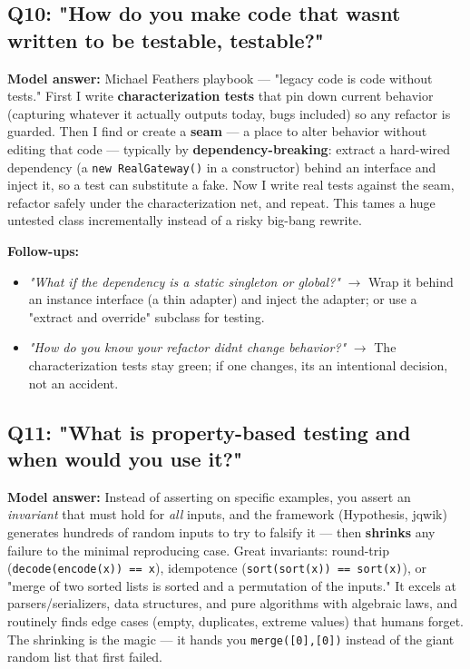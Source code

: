 \documentclass[11pt]{article}
\providecommand{\tightlist}{\setlength{\itemsep}{1pt}\setlength{\parskip}{0pt}}
\begin{document}
\subsection{Q10: "How do you make code that wasn\textquotesingle t written to be testable, testable?"}\label{q10-how-do-you-make-code-that-wasnt-written-to-be-testable-testable}

\textbf{Model answer:} Michael Feathers\textquotesingle{} playbook --- "legacy code is code without tests." First I write \textbf{characterization tests} that pin down current behavior (capturing whatever it actually outputs today, bugs included) so any refactor is guarded. Then I find or create a \textbf{seam} --- a place to alter behavior without editing that code --- typically by \textbf{dependency-breaking}: extract a hard-wired dependency (a \texttt{new\ RealGateway()} in a constructor) behind an interface and inject it, so a test can substitute a fake. Now I write real tests against the seam, refactor safely under the characterization net, and repeat. This tames a huge untested class incrementally instead of a risky big-bang rewrite.

\textbf{Follow-ups:}

\begin{itemize}
\tightlist
\item
  \emph{"What if the dependency is a static singleton or global?"} \(\rightarrow\) Wrap it behind an instance interface (a thin adapter) and inject the adapter; or use a "extract and override" subclass for testing.
\item
  \emph{"How do you know your refactor didn\textquotesingle t change behavior?"} \(\rightarrow\) The characterization tests stay green; if one changes, it\textquotesingle s an intentional decision, not an accident.
\end{itemize}

\subsection{Q11: "What is property-based testing and when would you use it?"}\label{q11-what-is-property-based-testing-and-when-would-you-use-it}

\textbf{Model answer:} Instead of asserting on specific examples, you assert an \emph{invariant} that must hold for \emph{all} inputs, and the framework (Hypothesis, jqwik) generates hundreds of random inputs to try to falsify it --- then \textbf{shrinks} any failure to the minimal reproducing case. Great invariants: round-trip (\texttt{decode(encode(x))\ ==\ x}), idempotence (\texttt{sort(sort(x))\ ==\ sort(x)}), or "merge of two sorted lists is sorted and a permutation of the inputs." It excels at parsers/serializers, data structures, and pure algorithms with algebraic laws, and routinely finds edge cases (empty, duplicates, extreme values) that humans forget. The shrinking is the magic --- it hands you \texttt{merge({[}0{]},{[}0{]})} instead of the giant random list that first failed.
\end{document}
